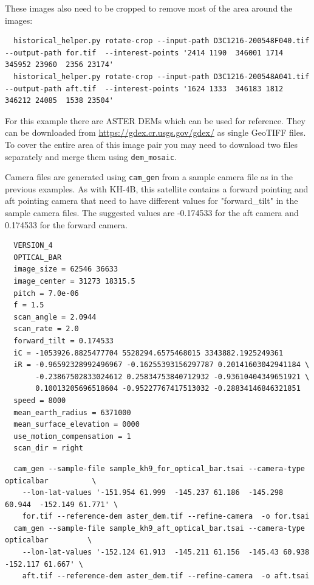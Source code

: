 These images also need to be cropped to remove most of the area around the images:

\begin{verbatim}
  historical_helper.py rotate-crop --input-path D3C1216-200548F040.tif  --output-path for.tif  --interest-points '2414 1190  346001 1714  345952 23960  2356 23174'
  historical_helper.py rotate-crop --input-path D3C1216-200548A041.tif  --output-path aft.tif  --interest-points '1624 1333  346183 1812  346212 24085  1538 23504'
\end{verbatim}

For this example there are ASTER DEMs which can be used for reference.  They can be downloaded from
\url{https://gdex.cr.usgs.gov/gdex/} as single GeoTIFF files.  To cover the entire area of this
image pair you may need to download two files separately and merge them using \texttt{dem\_mosaic}.

Camera files are generated using \texttt{cam\_gen} from a sample camera file as in the previous examples.
As with KH-4B, this satellite contains a forward pointing and aft pointing camera that need to have
different values for "forward\_tilt" in the sample camera files.  The suggested values are -0.174533
for the aft camera and 0.174533 for the forward camera.

\begin{verbatim}
  VERSION_4
  OPTICAL_BAR
  image_size = 62546 36633
  image_center = 31273 18315.5
  pitch = 7.0e-06
  f = 1.5
  scan_angle = 2.0944
  scan_rate = 2.0
  forward_tilt = 0.174533
  iC = -1053926.8825477704 5528294.6575468015 3343882.1925249361
  iR = -0.96592328992496967 -0.16255393156297787 0.20141603042941184 \
       -0.23867502833024612 0.25834753840712932 -0.93610404349651921 \
       0.10013205696518604 -0.95227767417513032 -0.28834146846321851
  speed = 8000
  mean_earth_radius = 6371000
  mean_surface_elevation = 0000
  use_motion_compensation = 1
  scan_dir = right
\end{verbatim}


\begin{verbatim}
  cam_gen --sample-file sample_kh9_for_optical_bar.tsai --camera-type opticalbar          \
    --lon-lat-values '-151.954 61.999  -145.237 61.186  -145.298 60.944  -152.149 61.771' \
    for.tif --reference-dem aster_dem.tif --refine-camera  -o for.tsai
  cam_gen --sample-file sample_kh9_aft_optical_bar.tsai --camera-type opticalbar         \
    --lon-lat-values '-152.124 61.913  -145.211 61.156  -145.43 60.938  -152.117 61.667' \
    aft.tif --reference-dem aster_dem.tif --refine-camera  -o aft.tsai
\end{verbatim}

